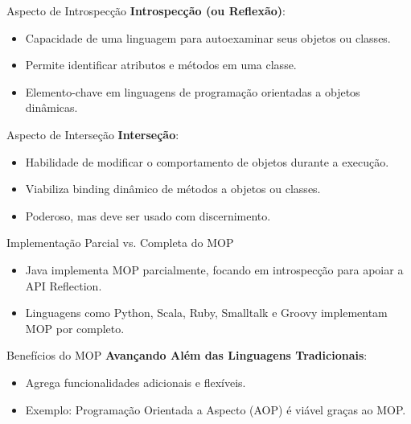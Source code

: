 \documentclass{beamer}
\begin{document}
\begin{frame}{Aspecto de Introspecção}
	\textbf{Introspecção (ou Reflexão)}:
	\begin{itemize}
		\item Capacidade de uma linguagem para autoexaminar seus objetos ou classes.
		\item Permite identificar atributos e métodos em uma classe.
		\item Elemento-chave em linguagens de programação orientadas a objetos dinâmicas.
	\end{itemize}
\end{frame}

\begin{frame}{Aspecto de Interseção}
	\textbf{Interseção}:
	\begin{itemize}
		\item Habilidade de modificar o comportamento de objetos durante a execução.
		\item Viabiliza binding dinâmico de métodos a objetos ou classes.
		\item Poderoso, mas deve ser usado com discernimento.
	\end{itemize}
\end{frame}
\begin{frame}{Implementação Parcial vs. Completa do MOP}
	\begin{itemize}
		\item Java implementa MOP parcialmente, focando em introspecção para apoiar a API Reflection.
		\item Linguagens como Python, Scala, Ruby, Smalltalk e Groovy implementam MOP por completo.
	\end{itemize}
\end{frame}

\begin{frame}{Benefícios do MOP}
	\textbf{Avançando Além das Linguagens Tradicionais}:
	\begin{itemize}
		\item Agrega funcionalidades adicionais e flexíveis.
		\item Exemplo: Programação Orientada a Aspecto (AOP) é viável graças ao MOP.
	\end{itemize}
\end{frame}
\end{document}
